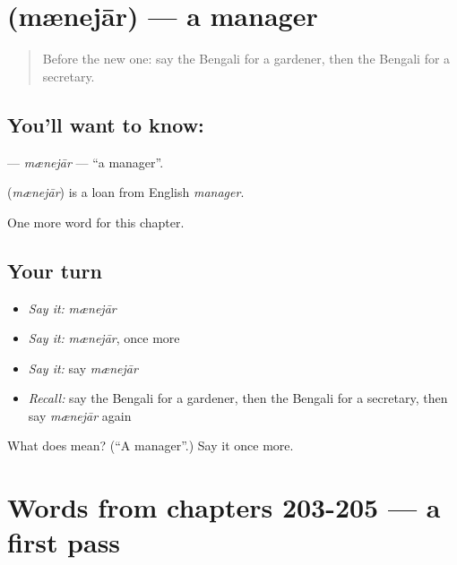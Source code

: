 \section[\texorpdfstring{\bn{ম্যানেজার} (mænejār)}{ম্যানেজার (mænejār)}]{ (mænejār) — a manager}

\label{lesson:BN-C208-mnejar}



\begin{quote}
Before the new one: say the Bengali for a gardener, then the Bengali for a secretary.
\end{quote}

\subsection*{You'll want to know: }
\textbf{} — \emph{mænejār} — \textquotedblleft{}a manager\textquotedblright{}.

\begin{cousinweb}
\textbf{} (\emph{mænejār}) is a loan from English \emph{manager}.
\end{cousinweb}

\begin{grammarlens}[title={What you've built}]
One more word for this chapter.
\end{grammarlens}

\subsection*{Your turn}
\begin{itemize}
\raggedright
  \item \emph{Say it:} \emph{mænejār}
  \item \emph{Say it:} \emph{mænejār}, once more
  \item \emph{Say it:} say \emph{mænejār}
  \item \emph{Recall:} say the Bengali for a gardener, then the Bengali for a secretary, then say \emph{mænejār} again
\end{itemize}

\begin{tcolorbox}[breakable,colback=teal!4,colframe=teal!35!black,title={Before you move on}]
What does  mean? (\textquotedblleft{}A manager\textquotedblright{}.) Say it once more.
\end{tcolorbox}
\section[(dialogue)]{Words from chapters 203-205 — a first pass}

